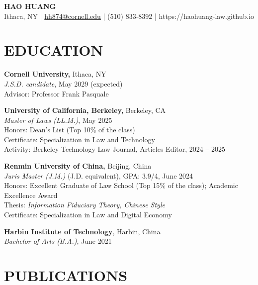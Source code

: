 \documentclass[a4paper,9pt]{extarticle}
\begin{document}
\raggedright

\pagestyle{empty}

\begin{center}
\textbf{\Large HAO HUANG }\\[3pt] %
Ithaca, NY | \href{mailto:hh874@cornell.edu}{hh874@cornell.edu} | (510) 833-8392 | https://haohuang-law.github.io %
\end{center}


\section*{EDUCATION}
\noindent
\textbf{Cornell University, }Ithaca, NY\\
\textit{J.S.D. candidate}, May 2029 (expected)\\ 
Advisor: Professor Frank Pasquale\\
\par\medskip
\noindent
\textbf{University of California, Berkeley, }Berkeley, CA\\
\textit{Master of Laws (LL.M.)}, May 2025\\
Honors: Dean's List (Top 10\% of the class)\\
Certificate: Specialization in Law and Technology \\
Activity: Berkeley Technology Law Journal, Articles Editor, 2024 – 2025\\ 
\par\medskip
\noindent
\textbf{\textbf{Renmin University of China}, }Beijing, China \\
\textit{Juris Master (J.M.)} (J.D. equivalent), GPA: 3.9/4, June 2024\\
Honors: Excellent Graduate of Law School (Top 15\% of the class); Academic Excellence Award\\
Thesis: \textit{Information Fiduciary Theory, Chinese Style} \\
Certificate: Specialization in Law and Digital Economy\\ 
\par\medskip
\noindent
\textbf{Harbin Institute of Technology}, Harbin, China\\
\textit{Bachelor of Arts (B.A.)}, June 2021
 

\section*{PUBLICATIONS}
\end{document}
